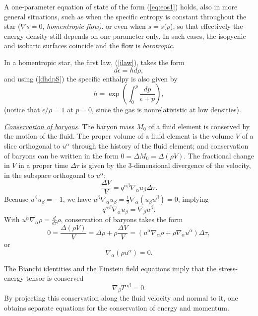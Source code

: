 \documentclass[12pt]{article}
\def\be{\begin{equation}}
\def\ee{\end{equation}}
\newcommand{\dis}{\displaystyle}
\begin{document}
A one-parameter equation 
of state of the form (\ref{eq:eos1}) holds, also in more
general situations, such as when the specific entropy is constant throughout
the star ($\nabla s = 0$,  {\it homentropic flow)}. 
or even when $s=s(\rho$), so that effectively the energy density still depends on one parameter only. In such cases, the isopycnic and
isobaric surfaces coincide and the flow is {\it barotropic}.


In a homentropic star, the first law, (\ref{ilaw}), takes the form
\be
   d\epsilon = h d\rho, 
\label{dedrho}\ee
and using (\ref{dhdpS}) the specific enthalpy is also given by
\be
    h = \exp\left(\int_0^p \frac{dp}{\epsilon+p}\right),
\label{enth2}\ee 
(notice that  $\dis \epsilon/\rho = 1$ at $p = 0$, since the gas is nonrelativistic at low densities).  


\vskip0.8cm

\noindent
{\it \uline{Conservation of baryons}.}
The baryon mass $ M_0$ of a fluid element is conserved by the motion
of the fluid. The proper volume of a fluid element is the volume $ V$
of a slice orthogonal to $u^\alpha$ through the history of the fluid
element; and conservation of baryons can be written in the form
$ 0 = \Delta M_0 = \Delta (\rho V)$.
The fractional change in $ V$ in a proper time $ \Delta \tau$ is
given by the 3-dimensional divergence of the velocity, in the subspace
orthogonal to $ u^\alpha$:
\be
  \frac{\Delta V}V = q^{\alpha\beta}\nabla_\alpha u_\beta \Delta \tau.
\label{eq:divu1}\ee
Because $ u^\beta u_\beta = -1$, we have
$ u^\beta \nabla_\alpha u_\beta = \frac12 \nabla_\alpha( u_\beta
u^\beta)
 = 0$, implying
\be
q^{\alpha\beta}\nabla_\alpha u_\beta = \nabla_\beta u^\beta.
\label{eq:divu2}\ee
With $\displaystyle u^\alpha \nabla_\alpha \rho = \frac d{d\tau}\rho$,
conservation of baryons takes the form
\be 0 = \frac{\Delta(\rho V)}V
= \Delta\rho+\rho\frac{\Delta V}V
= (u^\alpha\nabla_\alpha\rho + \rho \nabla_\alpha u^\alpha)\Delta
\tau,
\label{drhodv}\ee
or
\be
       \boxed{ \nabla_\alpha (\rho u^\alpha) = 0}.
\label{eq:baryon}\ee

\vskip 0.8cm
 The Bianchi identities and the Einstein field equations  imply that the
stress-energy
tensor is conserved
\be \nabla_\beta T^{\alpha\beta} = 0. \label{divT}\ee
By projecting this conservation along the fluid velocity and normal to it, one obtains separate equations for the conservation of energy and momentum. 
\end{document}
